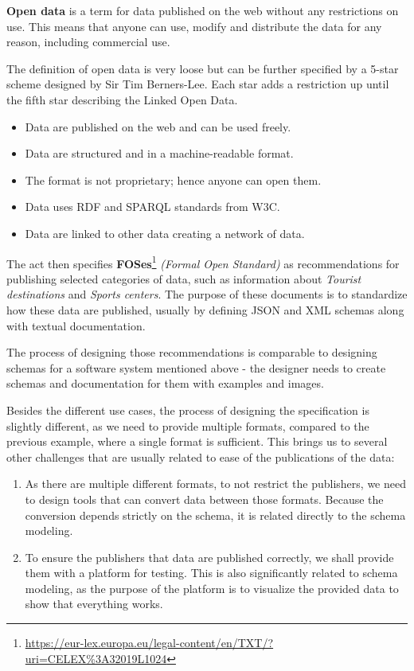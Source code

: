 \medskip

\textbf{Open data} is a term for data published on the web without any restrictions on use. This means that anyone can use, modify and distribute the data for any reason, including commercial use.

The definition of open data is very loose but can be further specified by a 5-star scheme designed by Sir Tim Berners-Lee. Each star adds a restriction up until the fifth star describing the Linked Open Data.
\begin{itemize}[noitemsep,leftmargin=2cm]
    \item [1 $\bigstar$] Data are published on the web and can be used freely.
    \item [2 $\bigstar$] Data are structured and in a machine-readable format.
    \item [3 $\bigstar$] The format is not proprietary; hence anyone can open them.
    \item [4 $\bigstar$] Data uses RDF and SPARQL standards from W3C.
    \item [5 $\bigstar$] Data are linked to other data creating a network of data.
\end{itemize}

\medskip

The act then specifies \textbf{FOSes}\footnote{\url{https://eur-lex.europa.eu/legal-content/en/TXT/?uri=CELEX\%3A32019L1024}} \textit{(Formal Open Standard)} as recommendations for publishing selected categories of data, such as information about \textit{Tourist destinations} and \textit{Sports centers}. The purpose of these documents is to standardize how these data are published, usually by defining JSON and XML schemas along with textual documentation.

The process of designing those recommendations is comparable to designing schemas for a software system mentioned above - the designer needs to create schemas and documentation for them with examples and images.

Besides the different use cases, the process of designing the specification is slightly different, as we need to provide multiple formats, compared to the previous example, where a single format is sufficient. This brings us to several other challenges that are usually related to ease of the publications of the data:
\begin{enumerate}
  \item As there are multiple different formats, to not restrict the publishers, we need to design tools that can convert data between those formats. Because the conversion depends strictly on the schema, it is related directly to the schema modeling.
  \item To ensure the publishers that data are published correctly, we shall provide them with a platform for testing. This is also significantly related to schema modeling, as the purpose of the platform is to visualize the provided data to show that everything works.
\end{enumerate}


